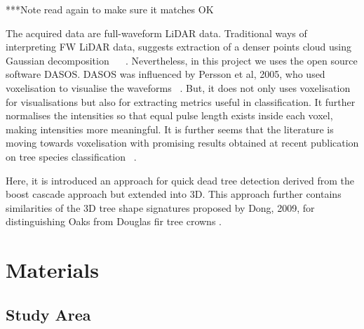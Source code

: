 \documentclass{subfiles}
\begin{document}
{\color{red} ***Note read again to make sure it matches OK}
\par The acquired data are full-waveform LiDAR data. Traditional ways of interpreting FW LiDAR data, suggests extraction of a denser points cloud using Gaussian decomposition ~\cite{Neuenschwander2009} ~\cite{Reitberger2008}. Nevertheless, in this project we uses the open source software DASOS. DASOS was influenced by Persson et al, 2005, who used voxelisation to visualise the waveforms ~\cite{Persson2005}. But, it does not only uses voxelisation for visualisations but also for extracting metrics useful in classification. It further normalises the intensities so that equal pulse length exists inside each voxel, making intensities more meaningful. It is further seems that the literature is moving towards voxelisation with promising results obtained at recent publication on tree species classification ~\cite{Cao2016}. 

Here, it is introduced an approach for quick dead tree detection derived from the boost cascade approach \cite{Viola2001} but extended into 3D. This approach further contains similarities of the 3D tree shape signatures proposed by Dong, 2009, for distinguishing Oaks from Douglas fir tree crowns \cite{Dong2009}. 












\section{Materials}


\subsection{Study Area} \label{sec:StudyArea}
\end{document}
